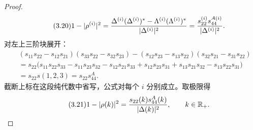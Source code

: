 \begin{proof}
\begin{equation}
\end{equation}
\begin{equation}\originaleq{3.20}
1-|\rho^{(i)}|^2=\dfrac{\Delta^{(i)}(\Delta^{(i)})^*-\Lambda^{(i)}(\Lambda^{(i)})^*}{|\Delta^{(i)}|^2}
=\dfrac{s_{22}^{(i)}s_{44}^{A(i)}}{|\Delta^{(i)}|^2}.
\end{equation}
对左上三阶块展开：
\[
\begin{aligned}
&(s_{11}s_{22}-s_{12}s_{21})(s_{33}s_{22}-s_{32}s_{23})
-(s_{12}s_{23}-s_{13}s_{22})(s_{32}s_{21}-s_{31}s_{22})\\
&=s_{22}\bigl(s_{11}s_{22}s_{33}-s_{11}s_{23}s_{32}-s_{12}s_{21}s_{33}
+s_{12}s_{23}s_{31}+s_{13}s_{21}s_{32}-s_{13}s_{22}s_{31}\bigr)\\
&=s_{22}s(1,2,3)=s_{22}s_{44}^A.
\end{aligned}
\]
截断上标在这段纯代数中省写，公式对每个 $i$ 分别成立。取极限得
\begin{equation}\originaleq{3.21}
1-|\rho(k)|^2=\dfrac{s_{22}(k)s_{44}^A(k)}{|\Delta(k)|^2},\qquad k\in\mathbb R_+.
\end{equation}
\end{proof}
\begin{note}
\end{note}
